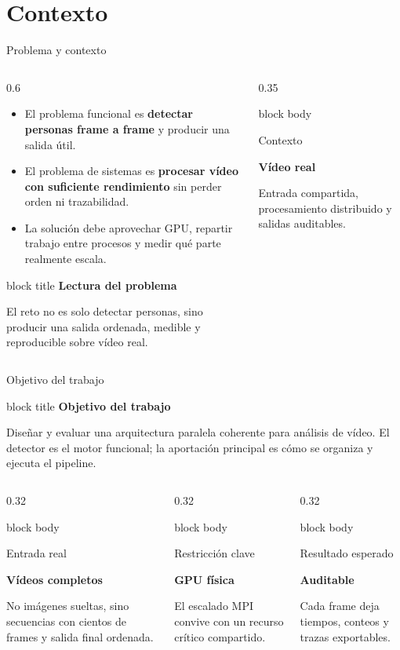 \documentclass[aspectratio=169,11pt]{beamer}
\newcommand{\metriccard}[3]{
  \begin{beamercolorbox}[wd=\linewidth,sep=0.65em,rounded=true,shadow=false]{block body}
    {\small\color{GraphGray}#1\par}
    \vspace{0.1em}
    {\bfseries\fontsize{16}{18}\selectfont #2\par}
    \vspace{0.1em}
    {\footnotesize #3\par}
  \end{beamercolorbox}
}
\newcommand{\callout}[2]{
  \begin{beamercolorbox}[wd=\linewidth,sep=0.6em,rounded=true,shadow=false]{block title}
    {\bfseries #1}\par
    \vspace{0.15em}
    {\footnotesize #2}
  \end{beamercolorbox}
}
\begin{document}
\section{Contexto}

\begin{frame}{Problema y contexto}
  \small
  \begin{columns}[T,totalwidth=\textwidth]
    \begin{column}{0.6\textwidth}
      \begin{itemize}
        \item El problema funcional es \textbf{detectar personas frame a frame} y producir una salida útil.
        \item El problema de sistemas es \textbf{procesar vídeo con suficiente rendimiento} sin perder orden ni trazabilidad.
        \item La solución debe aprovechar GPU, repartir trabajo entre procesos y medir qué parte realmente escala.
      \end{itemize}

      \vspace{0.2em}
      \callout{Lectura del problema}{
        El reto no es solo detectar personas, sino producir una salida ordenada, medible y reproducible sobre vídeo real.}
    \end{column}
    \begin{column}{0.35\textwidth}
      \metriccard{Contexto}{Vídeo real}{Entrada compartida, procesamiento distribuido y salidas auditables.}
    \end{column}
  \end{columns}
\end{frame}

\begin{frame}{Objetivo del trabajo}
  \small
  \callout{Objetivo del trabajo}{
    Diseñar y evaluar una arquitectura paralela coherente para análisis de vídeo. El detector es el motor funcional; la aportación principal es cómo se organiza y ejecuta el pipeline.}

  \vspace{0.35em}
  \begin{columns}[T,totalwidth=\textwidth]
    \begin{column}{0.32\textwidth}
      \metriccard{Entrada real}{Vídeos completos}{No imágenes sueltas, sino secuencias con cientos de frames y salida final ordenada.}
    \end{column}
    \begin{column}{0.32\textwidth}
      \metriccard{Restricción clave}{1 GPU física}{El escalado MPI convive con un recurso crítico compartido.}
    \end{column}
    \begin{column}{0.32\textwidth}
      \metriccard{Resultado esperado}{Auditable}{Cada frame deja tiempos, conteos y trazas exportables.}
    \end{column}
  \end{columns}
\end{frame}
\end{document}
